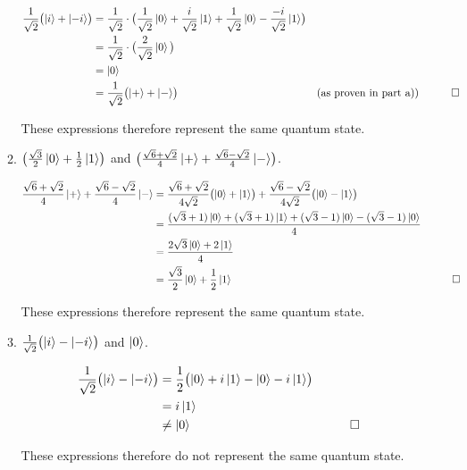 \documentclass{article}
\begin{document}
\begin{enumerate}
\begin{enumerate}
\begin{align*}
    \frac{1}{\sqrt{2}} \bigl(\ket{i} + \ket{-i}\bigr)  &= \frac{1}{\sqrt{2}} \cdot \bigl(\frac{1}{\sqrt{2}}\ket{0} + \frac{i}{\sqrt{2}}\ket{1} + \frac{1}{\sqrt{2}}\ket{0} - \frac{-i}{\sqrt{2}}\ket{1}\bigr) \\
    &= \frac{1}{\sqrt{2}} \cdot \bigl(\frac{2}{\sqrt{2}} \ket{0} \bigl) \\
    &= \ket{0} \\
    &=  \frac{1}{\sqrt{2}} \bigl(\ket{+} + \ket{-}\bigr) &&\text{(as proven in part a))}&&\qedhere
\end{align*}

These expressions therefore represent the same quantum state.

		\item $ \bigl(\frac{\sqrt{3}}{2} \ket0 + \frac{1}{2} \ket1\bigr) $ and $ \bigl( \frac{\sqrt{6} + \sqrt{2}}{4} \ket{+} + \frac{\sqrt{6} - \sqrt{2}}{4} \ket{-}\bigr)$.

\begin{align*}
    \frac{\sqrt{6} + \sqrt{2}}{4} \ket{+} + \frac{\sqrt{6} - \sqrt{2}}{4} \ket{-}  &= 
	 \frac{\sqrt{6} + \sqrt{2}}{4\sqrt{2}} \bigl(\ket{0} + \ket{1}\bigr) +  \frac{\sqrt{6} - \sqrt{2}}{4\sqrt{2}} \bigl(\ket{0} - \ket{1}\bigr) \\
    &= \frac{(\sqrt{3} + 1)\ket{0} + (\sqrt{3} + 1)\ket{1} + (\sqrt{3} - 1)\ket{0} - (\sqrt{3} - 1)\ket{0}}{4} \\
    &= \frac{2 \sqrt{3} \ket{0} + 2 \ket{1}}{4} \\
    &= \frac{\sqrt{3}}{2}\ket{0} + \frac{1}{2}\ket{1}  &&\qedhere
\end{align*}

These expressions therefore represent the same quantum state.
\newline

		\item $\frac{1}{\sqrt{2}} \bigl(\ket{i} - \ket{-i}\bigr)$ and $\ket0$.
	
\begin{align*}
   \frac{1}{\sqrt{2}} \bigl(\ket{i} - \ket{-i}\bigr)  &= \frac{1}{2} \bigl(\ket{0} + i\ket{1} - \ket{0} - i\ket{1}\bigr) \\
    &= i \ket{1} \\
    &\neq \ket{0} &&\qedhere
\end{align*}

These expressions therefore do not represent the same quantum state.

\end{enumerate}


\end{enumerate}
\end{document}
